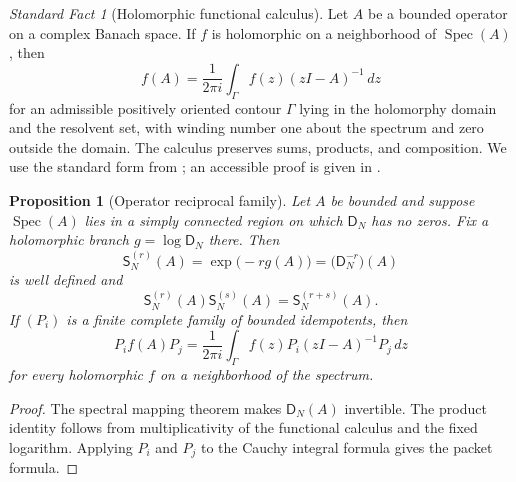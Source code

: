 \documentclass[11pt,a4paper]{article}
\newtheorem{proposition}[theorem]{Proposition}
\theoremstyle{definition}
\theoremstyle{remark}
\newcommand{\Spec}{\operatorname{Spec}}
\newtheorem{standardfact}[theorem]{Standard Fact}
\newcommand{\Dfun}{\mathsf D}
\newcommand{\Sfun}{\mathsf S}
\begin{document}
\begin{standardfact}[Holomorphic functional calculus]\label{migration:record:001}\label{migration:sf:holomorphic_calculus}
Let $A$ be a bounded operator on a complex Banach space.  If $f$ is holomorphic on a neighborhood of $\Spec(A)$, then
\[
f(A)
=
\frac1{2\pi i}\int_\Gamma f(z)(zI-A)^{-1}\,dz
\]
for an admissible positively oriented contour $\Gamma$ lying in the holomorphy domain and the resolvent set, with winding number one about the spectrum and zero outside the domain. The calculus preserves sums, products, and composition.  We use the standard form from \cite{DunfordSchwartz1958}; an accessible proof is given in \cite[Appendix A]{TaylorBanachAlgebras}.
\end{standardfact}

\begin{proposition}[Operator reciprocal family]\label{migration:record:002}\label{migration:prop:operator_reciprocal}
Let $A$ be bounded and suppose $\Spec(A)$ lies in a simply connected region on which $\Dfun_N$ has no zeros.  Fix a holomorphic branch $g=\log\Dfun_N$ there.  Then
\[
\Sfun_N^{(r)}(A)
=
\exp\bigl(-r g(A)\bigr)
=
\bigl(\Dfun_N^{-r}\bigr)(A)
\]
is well defined and
\[
\Sfun_N^{(r)}(A)\Sfun_N^{(s)}(A)
=
\Sfun_N^{(r+s)}(A).
\]
If $(P_i)$ is a finite complete family of bounded idempotents, then
\[
P_i f(A)P_j
=
\frac1{2\pi i}
\int_\Gamma
f(z)P_i(zI-A)^{-1}P_j\,dz
\]
for every holomorphic $f$ on a neighborhood of the spectrum.
\end{proposition}

\begin{proof}
The spectral mapping theorem makes $\Dfun_N(A)$ invertible.  The product identity follows from multiplicativity of the functional calculus and the fixed logarithm.  Applying $P_i$ and $P_j$ to the Cauchy integral formula gives the packet formula.
\end{proof}


\clearpage
\end{document}
